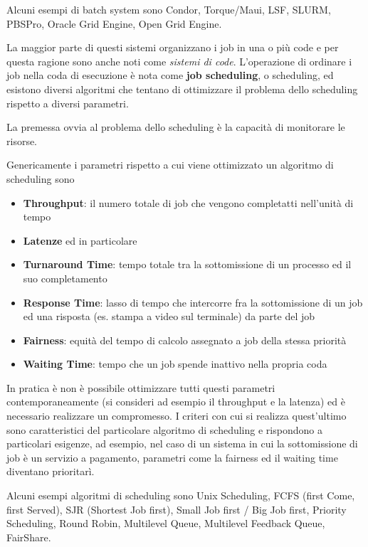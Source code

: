 Alcuni esempi di batch system sono Condor, Torque/Maui, LSF, SLURM,
PBSPro, Oracle Grid Engine, Open Grid Engine.

La maggior parte di questi sistemi organizzano i job in una o più code e
per questa ragione sono anche noti come \emph{sistemi di code}.
L'operazione di ordinare i job nella coda di esecuzione è nota come
\textbf{job scheduling}, o scheduling, ed esistono diversi algoritmi che
tentano di ottimizzare il problema dello scheduling rispetto a diversi
parametri.

La premessa ovvia al problema dello scheduling è la capacità di
monitorare le risorse.

Genericamente i parametri rispetto a cui viene ottimizzato un algoritmo
di scheduling sono

\begin{itemize}
\tightlist
\item
  \textbf{Throughput}: il numero totale di job che vengono completatti
  nell'unità di tempo
\item
  \textbf{Latenze} ed in particolare
\item
  \textbf{Turnaround Time}: tempo totale tra la sottomissione di un
  processo ed il suo completamento
\item
  \textbf{Response Time}: lasso di tempo che intercorre fra la
  sottomissione di un job ed una risposta (es. stampa a video sul
  terminale) da parte del job
\item
  \textbf{Fairness}: equità del tempo di calcolo assegnato a job della
  stessa priorità
\item
  \textbf{Waiting Time}: tempo che un job spende inattivo nella propria
  coda
\end{itemize}

In pratica è non è possibile ottimizzare tutti questi parametri
contemporaneamente (si consideri ad esempio il throughput e la latenza)
ed è necessario realizzare un compromesso. I criteri con cui si realizza
quest'ultimo sono caratteristici del particolare algoritmo di scheduling
e rispondono a particolari esigenze, ad esempio, nel caso di un sistema
in cui la sottomissione di job è un servizio a pagamento, parametri come
la fairness ed il waiting time diventano prioritarì.

Alcuni esempi algoritmi di scheduling sono Unix Scheduling, FCFS (first
Come, first Served), SJR (Shortest Job first), Small Job first / Big Job
first, Priority Scheduling, Round Robin, Multilevel Queue, Multilevel
Feedback Queue, FairShare.

